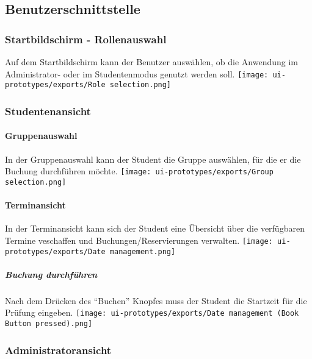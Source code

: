 \documentclass[]{article}
\let\oldparagraph\paragraph
\renewcommand{\paragraph}[1]{\oldparagraph{#1}\mbox{}}
\let\oldsubparagraph\subparagraph
\renewcommand{\subparagraph}[1]{\oldsubparagraph{#1}\mbox{}}
\begin{document}
\hypertarget{benutzerschnittstelle}{%
\subsection{Benutzerschnittstelle}\label{benutzerschnittstelle}}

\hypertarget{startbildschirm---rollenauswahl}{%
\subsubsection{Startbildschirm -
Rollenauswahl}\label{startbildschirm---rollenauswahl}}

Auf dem Startbildschirm kann der Benutzer auswählen, ob die Anwendung im
Administrator- oder im Studentenmodus genutzt werden soll.
\texttt{[image: ui-prototypes/exports/Role selection.png]}

\hypertarget{studentenansicht}{%
\subsubsection{Studentenansicht}\label{studentenansicht}}

\hypertarget{gruppenauswahl}{%
\paragraph{Gruppenauswahl}\label{gruppenauswahl}}

In der Gruppenauswahl kann der Student die Gruppe auswählen, für die er
die Buchung durchführen möchte.
\texttt{[image: ui-prototypes/exports/Group selection.png]}

\hypertarget{terminansicht}{%
\paragraph{Terminansicht}\label{terminansicht}}

In der Terminansicht kann sich der Student eine Übersicht über die
verfügbaren Termine veschaffen und Buchungen/Reservierungen verwalten.
\texttt{[image: ui-prototypes/exports/Date management.png]}

\hypertarget{buchung-durchfuxfchren}{%
\subparagraph{Buchung durchführen}\label{buchung-durchfuxfchren}}

Nach dem Drücken des ``Buchen'' Knopfes muss der Student die Startzeit
für die Prüfung eingeben.
\texttt{[image: ui-prototypes/exports/Date management (Book Button pressed).png]}

\hypertarget{administratoransicht}{%
\subsubsection{Administratoransicht}\label{administratoransicht}}
\end{document}
